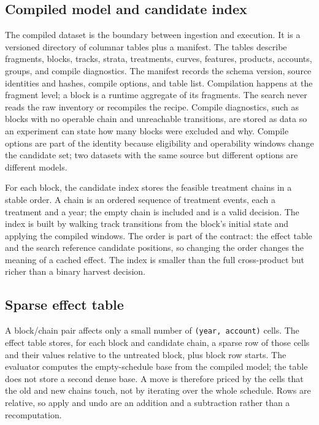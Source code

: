 \documentclass[a4paper,fleqn]{cas-sc}
\begin{document}
\subsection{Compiled model and candidate index}

The compiled dataset is the boundary between ingestion and execution. It is a versioned directory of
columnar tables plus a manifest. The tables describe fragments, blocks, tracks, strata, treatments,
curves, features, products, accounts, groups, and compile diagnostics. The manifest records the schema
version, source identities and hashes, compile options, and table list. Compilation happens at the
fragment level; a block is a runtime aggregate of its fragments. The search never reads the raw
inventory or recompiles the recipe. Compile diagnostics, such as blocks with no operable chain and
unreachable transitions, are stored as data so an experiment can state how many blocks were excluded
and why. Compile options are part of the identity because eligibility and operability windows change
the candidate set; two datasets with the same source but different options are different models.

For each block, the candidate index stores the feasible treatment chains in a stable order. A chain is
an ordered sequence of treatment events, each a treatment and a year; the empty chain is included and
is a valid decision. The index is built by walking track transitions from the block's initial state and
applying the compiled windows. The order is part of the contract: the effect table and the search
reference candidate positions, so changing the order changes the meaning of a cached effect. The index
is smaller than the full cross-product but richer than a binary harvest decision.

\subsection{Sparse effect table}

A block/chain pair affects only a small number of \texttt{(year, account)} cells. The effect table
stores, for each block and candidate chain, a sparse row of those cells and their values relative to
the untreated block, plus block row starts. The evaluator computes the empty-schedule base from the
compiled model; the table does not store a second dense base. A move is therefore priced by the cells
that the old and new chains touch, not by iterating over the whole schedule. Rows are relative, so
apply and undo are an addition and a subtraction rather than a recomputation.
\end{document}
